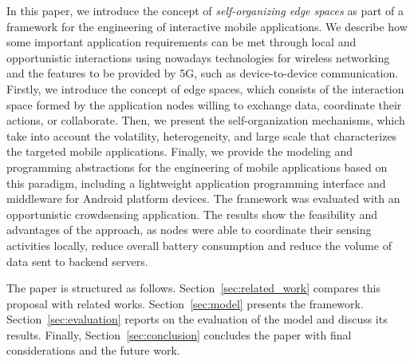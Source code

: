 In this paper, we introduce the concept of \textit{self-organizing edge spaces} as part of a framework for the engineering of interactive mobile applications. We describe how some important application requirements can be met through local and opportunistic interactions using nowadays technologies for wireless networking and the features to be provided by 5G, such as device-to-device communication. Firstly, we introduce the concept of edge spaces, which consists of the interaction space formed by the application nodes willing to exchange data, coordinate their actions, or collaborate. Then, we present the self-organization mechanisms, which take into account the volatility, heterogeneity, and large scale that characterizes the targeted mobile applications. Finally, we provide the modeling and programming abstractions for the engineering of mobile applications based on this paradigm, including a lightweight application programming interface and middleware for Android platform devices. The framework was evaluated with an opportunistic crowdsensing application. The results show the feasibility and advantages of the approach, as nodes were able to coordinate their sensing activities locally, reduce overall battery consumption and reduce the volume of data sent to backend servers.

The paper is structured as follows. Section~\ref{sec:related_work} compares this proposal with related works. Section~\ref{sec:model} presents the framework. Section~\ref{sec:evaluation} reports on the evaluation of the model and discuss its results. Finally, Section~\ref{sec:conclusion} concludes the paper with final considerations and the future work.
